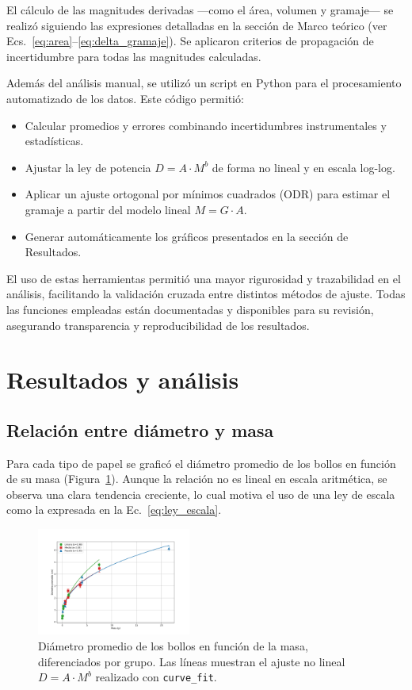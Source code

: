 \documentclass[12pt,a4]{article}
\begin{document}
El cálculo de las magnitudes derivadas —como el área, volumen y gramaje— se realizó siguiendo las expresiones detalladas en la sección de Marco teórico (ver Ecs.~\eqref{eq:area}–\eqref{eq:delta_gramaje}). Se aplicaron criterios de propagación de incertidumbre para todas las magnitudes calculadas.

Además del análisis manual, se utilizó un script en Python para el procesamiento automatizado de los datos. Este código permitió:

\begin{itemize}
    \item Calcular promedios y errores combinando incertidumbres instrumentales y estadísticas.
    \item Ajustar la ley de potencia \( D = A \cdot M^b \) de forma no lineal y en escala log-log.
    \item Aplicar un ajuste ortogonal por mínimos cuadrados (ODR) para estimar el gramaje a partir del modelo lineal \( M = G \cdot A \).
    \item Generar automáticamente los gráficos presentados en la sección de Resultados.
\end{itemize}

El uso de estas herramientas permitió una mayor rigurosidad y trazabilidad en el análisis, facilitando la validación cruzada entre distintos métodos de ajuste. Todas las funciones empleadas están documentadas y disponibles para su revisión, asegurando transparencia y reproducibilidad de los resultados.

\section{Resultados y análisis}

\subsection{Relación entre diámetro y masa}

Para cada tipo de papel se graficó el diámetro promedio de los bollos en función de su masa (Figura~\ref{fig:diametro_vs_masa}). Aunque la relación no es lineal en escala aritmética, se observa una clara tendencia creciente, lo cual motiva el uso de una ley de escala como la expresada en la Ec.~\eqref{eq:ley_escala}.

\begin{figure}[H]
    \centering
    \includegraphics[width=0.45\textwidth]{diametro_vs_masa.png}
    \caption{Diámetro promedio de los bollos en función de la masa, diferenciados por grupo. Las líneas muestran el ajuste no lineal \( D = A \cdot M^b \) realizado con \texttt{curve\_fit}.}
    \label{fig:diametro_vs_masa}
\end{figure}
\end{document}
